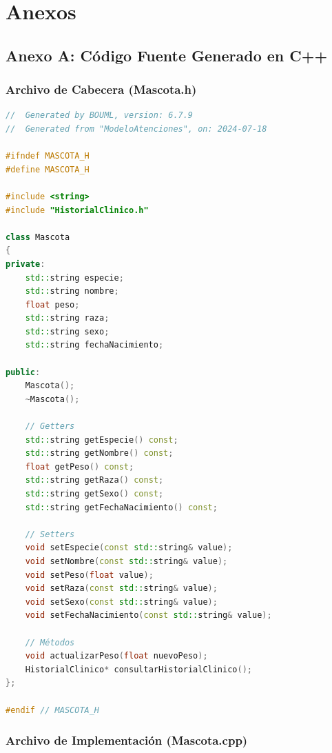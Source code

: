 \documentclass[12pt,a4paper]{article}
\begin{document}
\newpage
\section{Anexos}

\subsection{Anexo A: Código Fuente Generado en C++}

\subsubsection{Archivo de Cabecera (Mascota.h)}

\begin{lstlisting}[language=C++, caption=Código generado para la clase Mascota - Mascota.h]
//  Generated by BOUML, version: 6.7.9
//  Generated from "ModeloAtenciones", on: 2024-07-18

#ifndef MASCOTA_H
#define MASCOTA_H

#include <string>
#include "HistorialClinico.h"

class Mascota
{
private:
    std::string especie;
    std::string nombre;
    float peso;
    std::string raza;
    std::string sexo;
    std::string fechaNacimiento;

public:
    Mascota();
    ~Mascota();

    // Getters
    std::string getEspecie() const;
    std::string getNombre() const;
    float getPeso() const;
    std::string getRaza() const;
    std::string getSexo() const;
    std::string getFechaNacimiento() const;

    // Setters
    void setEspecie(const std::string& value);
    void setNombre(const std::string& value);
    void setPeso(float value);
    void setRaza(const std::string& value);
    void setSexo(const std::string& value);
    void setFechaNacimiento(const std::string& value);

    // Métodos
    void actualizarPeso(float nuevoPeso);
    HistorialClinico* consultarHistorialClinico();
};

#endif // MASCOTA_H
\end{lstlisting}

\subsubsection{Archivo de Implementación (Mascota.cpp)}
\end{document}
